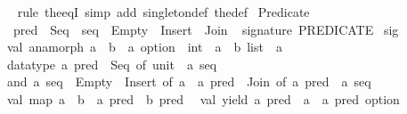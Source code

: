 \begin{isabellebody}
%
\isadelimproof
\ \ %
\endisadelimproof
%
\isatagproof
{}\isamarkupfalse%
\ {\isacharparenleft}{\kern0pt}rule\ the{\isacharunderscore}{\kern0pt}eqI{\isacharparenright}{\kern0pt}\ {\isacharparenleft}{\kern0pt}simp\ add{\isacharcolon}{\kern0pt}\ singleton{\isacharunderscore}{\kern0pt}def\ the{\isacharunderscore}{\kern0pt}def{\isacharparenright}{\kern0pt}%
\endisatagproof
{\isafoldproof}%
%
\isadelimproof
\isanewline
%
\endisadelimproof
\isanewline
{}\isamarkupfalse%
\ Predicate\isanewline
\ \ \ pred\ {\isacharequal}{\kern0pt}\ Seq\ \ seq\ {\isacharequal}{\kern0pt}\ Empty\ {\isacharbar}{\kern0pt}\ Insert\ {\isacharbar}{\kern0pt}\ Join\isanewline
%
\isadelimML
\isanewline
%
\endisadelimML
%
\isatagML
{}\isamarkupfalse%
\ {\isacartoucheopen}\isanewline
signature\ PREDICATE\ {\isacharequal}{\kern0pt}\isanewline
sig\isanewline
\ \ val\ anamorph{\isacharcolon}{\kern0pt}\ {\isacharparenleft}{\kern0pt}{\isacharprime}{\kern0pt}a\ {\isacharminus}{\kern0pt}{\isachargreater}{\kern0pt}\ {\isacharparenleft}{\kern0pt}{\isacharprime}{\kern0pt}b\ {\isacharasterisk}{\kern0pt}\ {\isacharprime}{\kern0pt}a{\isacharparenright}{\kern0pt}\ option{\isacharparenright}{\kern0pt}\ {\isacharminus}{\kern0pt}{\isachargreater}{\kern0pt}\ int\ {\isacharminus}{\kern0pt}{\isachargreater}{\kern0pt}\ {\isacharprime}{\kern0pt}a\ {\isacharminus}{\kern0pt}{\isachargreater}{\kern0pt}\ {\isacharprime}{\kern0pt}b\ list\ {\isacharasterisk}{\kern0pt}\ {\isacharprime}{\kern0pt}a\isanewline
\ \ datatype\ {\isacharprime}{\kern0pt}a\ pred\ {\isacharequal}{\kern0pt}\ Seq\ of\ {\isacharparenleft}{\kern0pt}unit\ {\isacharminus}{\kern0pt}{\isachargreater}{\kern0pt}\ {\isacharprime}{\kern0pt}a\ seq{\isacharparenright}{\kern0pt}\isanewline
\ \ and\ {\isacharprime}{\kern0pt}a\ seq\ {\isacharequal}{\kern0pt}\ Empty\ {\isacharbar}{\kern0pt}\ Insert\ of\ {\isacharprime}{\kern0pt}a\ {\isacharasterisk}{\kern0pt}\ {\isacharprime}{\kern0pt}a\ pred\ {\isacharbar}{\kern0pt}\ Join\ of\ {\isacharprime}{\kern0pt}a\ pred\ {\isacharasterisk}{\kern0pt}\ {\isacharprime}{\kern0pt}a\ seq\isanewline
\ \ val\ map{\isacharcolon}{\kern0pt}\ {\isacharparenleft}{\kern0pt}{\isacharprime}{\kern0pt}a\ {\isacharminus}{\kern0pt}{\isachargreater}{\kern0pt}\ {\isacharprime}{\kern0pt}b{\isacharparenright}{\kern0pt}\ {\isacharminus}{\kern0pt}{\isachargreater}{\kern0pt}\ {\isacharprime}{\kern0pt}a\ pred\ {\isacharminus}{\kern0pt}{\isachargreater}{\kern0pt}\ {\isacharprime}{\kern0pt}b\ pred\isanewline
\ \ val\ yield{\isacharcolon}{\kern0pt}\ {\isacharprime}{\kern0pt}a\ pred\ {\isacharminus}{\kern0pt}{\isachargreater}{\kern0pt}\ {\isacharparenleft}{\kern0pt}{\isacharprime}{\kern0pt}a\ {\isacharasterisk}{\kern0pt}\ {\isacharprime}{\kern0pt}a\ pred{\isacharparenright}{\kern0pt}\ option\isanewline

\end{isabellebody}
